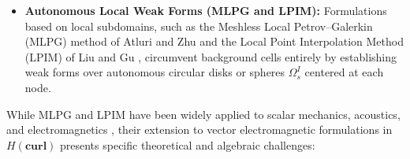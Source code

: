 \documentclass[VANCOUVER,Times1COL]{WileyNJD-v5}
\begin{document}
\begin{itemize}
    \item \textbf{Autonomous Local Weak Forms (MLPG and LPIM):} Formulations based on local subdomains, such as the Meshless Local Petrov--Galerkin (MLPG) method of Atluri and Zhu \cite{atluri1998new, atluri2002meshless} and the Local Point Interpolation Method (LPIM) of Liu and Gu \cite{liu2001local, liu2005introduction}, circumvent background cells entirely by establishing weak forms over autonomous circular disks or spheres $\Omega_s^I$ centered at each node.
\end{itemize}

While MLPG and LPIM have been widely applied to scalar mechanics, acoustics, and electromagnetics \cite{sladek2001local, atluri2002meshless, liu2001local,nicomedes2012meshless}, their extension to vector electromagnetic formulations in $H(\mathbf{curl})$ presents specific theoretical and algebraic challenges:
\end{document}
